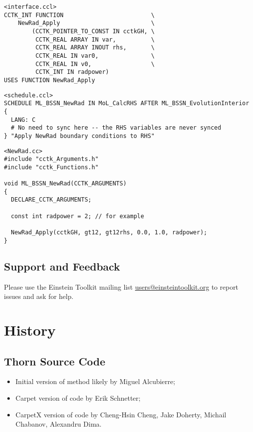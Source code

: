 \begin{verbatim}
<interface.ccl>
CCTK_INT FUNCTION                         \
    NewRad_Apply                          \
        (CCTK_POINTER_TO_CONST IN cctkGH, \
         CCTK_REAL ARRAY IN var,          \
         CCTK_REAL ARRAY INOUT rhs,       \
         CCTK_REAL IN var0,               \
         CCTK_REAL IN v0,                 \
         CCTK_INT IN radpower)
USES FUNCTION NewRad_Apply
\end{verbatim}

\begin{verbatim}
<schedule.ccl>
SCHEDULE ML_BSSN_NewRad IN MoL_CalcRHS AFTER ML_BSSN_EvolutionInterior
{
  LANG: C
  # No need to sync here -- the RHS variables are never synced
} "Apply NewRad boundary conditions to RHS"
\end{verbatim}

\begin{verbatim}
<NewRad.cc>
#include "cctk_Arguments.h"
#include "cctk_Functions.h"

void ML_BSSN_NewRad(CCTK_ARGUMENTS)
{
  DECLARE_CCTK_ARGUMENTS;

  const int radpower = 2; // for example

  NewRad_Apply(cctkGH, gt12, gt12rhs, 0.0, 1.0, radpower);
}
\end{verbatim}

\subsection{Support and Feedback}
Please use the Einstein Toolkit mailing list
\url{users@einsteintoolkit.org} to report issues and ask for help.

\section{History}

\subsection{Thorn Source Code}
\begin{itemize}
\item Initial version of method likely by Miguel Alcubierre;
\item Carpet version of code by Erik Schnetter;
\item CarpetX version of code by Cheng-Hsin Cheng, Jake Doherty, Michail Chabanov, Alexandru Dima.
\end{itemize}

